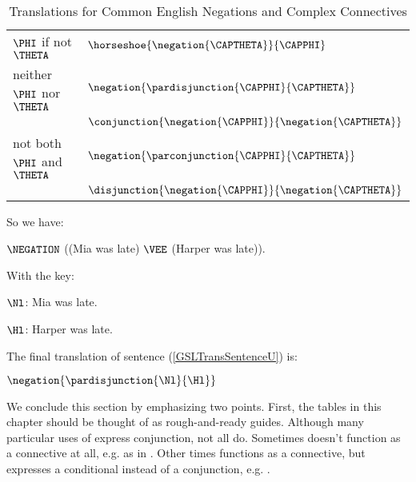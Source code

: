\begin{majorILnc}{}
\begin{table}
\begin{center}
\begin{tabular}{ l l }
				$\PHI$ if not $\THETA$ & $\horseshoe{\negation{\CAPTHETA}}{\CAPPHI}$ \\
				neither $\PHI$ nor $\THETA$ & $\negation{\pardisjunction{\CAPPHI}{\CAPTHETA}}$ \\
				& $\conjunction{\negation{\CAPPHI}}{\negation{\CAPTHETA}}$ \\
				not both $\PHI$ and $\THETA$ & $\negation{\parconjunction{\CAPPHI}{\CAPTHETA}}$ \\
				& $\disjunction{\negation{\CAPPHI}}{\negation{\CAPTHETA}}$ \\
				\bottomrule
			\end{tabular}
			\caption{Translations for Common English Negations and Complex Connectives}
			\label{TransTableF} 
		\end{center}
	\end{table}  
	So we have: 
	\begin{menumerate}
		\item\label{GSLTransSentenceV} $\NEGATION$ ((Mia was late) $\VEE$ (Harper was late)).
	\end{menumerate} 
	With the key: 
	\begin{description}[itemsep=0em]
		\item[Translation Scheme:] \hfill{} 
		\begin{description}[itemsep=0em]
			\item $\Nl$: Mia was late.
			\item $\Hl$: Harper was late. 
		\end{description} 
	\end{description}
	The final translation of sentence (\ref{GSLTransSentenceU}) is: 
	\begin{menumerate}
		\item\label{GSLTransSentenceW} $\negation{\pardisjunction{\Nl}{\Hl}}$
	\end{menumerate} 
\end{majorILnc}

\noindent{}We conclude this section by emphasizing two points.
First, the tables in this chapter should be thought of as rough-and-ready guides. 
Although many particular uses of  express conjunction, not all do. 
Sometimes  doesn't function as a connective at all, e.g. as in  \citep[107]{Smith2012}.
Other times  functions as a connective, but expresses a conditional instead of a conjunction, e.g.  \citep[107]{Smith2012}.

